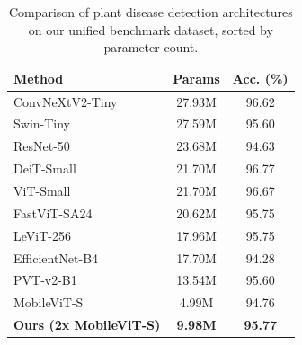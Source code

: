 \documentclass[runningheads]{llncs}
\begin{document}
\begin{table}[ht]
\centering
\caption{Comparison of plant disease detection architectures on our unified benchmark dataset, sorted by parameter count.}
\label{tab:wild_comparison}
\begin{tabular}{@{}l@{\hskip 0.6cm}c@{\hskip 0.6cm}c@{}}
\toprule
\textbf{Method} & \textbf{Params} & \textbf{Acc. (\%)} \\
\midrule
ConvNeXtV2-Tiny \cite{woo2023convnext} & 27.93M & 96.62 \\
Swin-Tiny \cite{liu2021swin} & 27.59M & 95.60 \\
ResNet-50 \cite{he2016deep} & 23.68M & 94.63 \\
DeiT-Small \cite{touvron2021training} & 21.70M & 96.77 \\
ViT-Small \cite{dosovitskiy2020image} & 21.70M & 96.67 \\
FastViT-SA24 \cite{vasu2023fastvit} & 20.62M & 95.75 \\
LeViT-256 \cite{graham2021levit} & 17.96M & 95.75 \\
EfficientNet-B4 \cite{tan2019efficientnet} & 17.70M & 94.28 \\
PVT-v2-B1 \cite{wang2022pvt} & 13.54M & 95.60 \\
MobileViT-S \cite{mehta2022} & 4.99M & 94.76 \\
\midrule
\textbf{Ours (2x MobileViT-S)} & \textbf{9.98M} & \textbf{95.77} \\
\bottomrule
\end{tabular}
\end{table}


\end{document}
